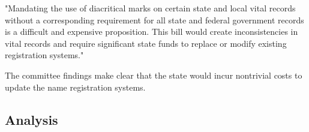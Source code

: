 "Mandating the use of diacritical marks on certain state and local vital records
without a corresponding requirement for all state and federal government records
is a difficult and expensive proposition. This bill would create inconsistencies
in vital records and require significant state funds to replace or modify
existing registration systems."

The committee findings make clear that the state would incur nontrivial costs to
update the name registration systems.

\subsection{Analysis}


